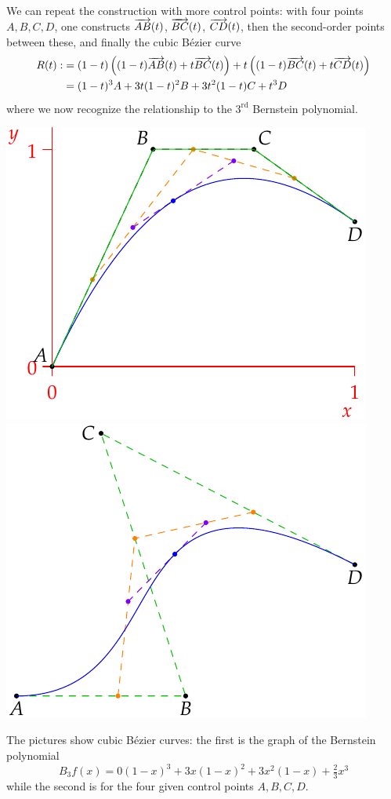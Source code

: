 We can repeat the construction with more control points: with four points $A,B,C,D$, one constructs $\overrightarrow{AB}(t)$, $\overrightarrow{BC}(t)$, $\overrightarrow{CD}(t)$, then the second-order points between these, and finally the cubic Bézier curve
\begin{align*}
	R(t):&=(1-t)\left((1-t)\overrightarrow{AB}(t)+t\overrightarrow{BC}(t)\right) +t\left((1-t)\overrightarrow{BC}(t)+t\overrightarrow{CD}(t)\right)\\
	&=(1-t)^3A+3t(1-t)^2B+3t^2(1-t)C+t^3D
\end{align*}
where we now recognize the relationship to the $3^\text{rd}$ Bernstein polynomial. 
\begin{center}
	\href{http://www.math.uci.edu/~ndonalds/math140b/bezier.html}{%
		\includegraphics[scale=0.95]{bezier-cubic2}
		\qquad\quad
		\includegraphics[scale=0.95]{bezier-cubicalt2}
	}
\end{center}
The pictures show cubic Bézier curves: the first is the graph of the Bernstein polynomial
\[
	B_3f(x)=0(1-x)^3+3x(1-x)^2+3x^2(1-x)+\tfrac 23x^3
\]
while the second is for the four given control points $A,B,C,D$.


